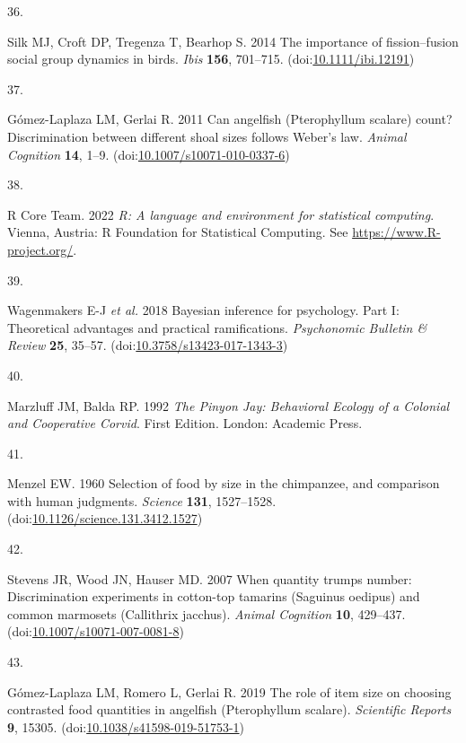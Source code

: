\documentclass[
  ,doc,floatsintext]{apa6}
\newlength{\cslhangindent}
\newlength{\csllabelwidth}
\newlength{\cslentryspacingunit} %
\newenvironment{CSLReferences}[2] %
 {%
  \setlength{\parindent}{0pt}
  \ifodd #1
  \let\oldpar\par
  \def\par{\hangindent=\cslhangindent\oldpar}
  \fi
  \setlength{\parskip}{#2\cslentryspacingunit}
 }%
 {}
\newcommand{\CSLLeftMargin}[1]{\parbox[t]{\csllabelwidth}{#1}}
\newcommand{\CSLRightInline}[1]{\parbox[t]{\linewidth - \csllabelwidth}{#1}\break}
\begin{document}
\begin{CSLReferences}{0}{0}
\leavevmode{}%
\CSLLeftMargin{36. }%
\CSLRightInline{Silk MJ, Croft DP, Tregenza T, Bearhop S. 2014 The importance of fission--fusion social group dynamics in birds. \emph{Ibis} \textbf{156}, 701--715. (doi:\href{https://doi.org/10.1111/ibi.12191}{10.1111/ibi.12191})}

\leavevmode{}%
\CSLLeftMargin{37. }%
\CSLRightInline{Gómez-Laplaza LM, Gerlai R. 2011 Can angelfish ({Pterophyllum} scalare) count? {Discrimination} between different shoal sizes follows {Weber}'s law. \emph{Animal Cognition} \textbf{14}, 1--9. (doi:\href{https://doi.org/10.1007/s10071-010-0337-6}{10.1007/s10071-010-0337-6})}

\leavevmode{}%
\CSLLeftMargin{38. }%
\CSLRightInline{R Core Team. 2022 \emph{R: A language and environment for statistical computing}. Vienna, Austria: R Foundation for Statistical Computing. See \url{https://www.R-project.org/}.}

\leavevmode{}%
\CSLLeftMargin{39. }%
\CSLRightInline{Wagenmakers E-J \emph{et al.} 2018 Bayesian inference for psychology. {Part} {I}: {Theoretical} advantages and practical ramifications. \emph{Psychonomic Bulletin \& Review} \textbf{25}, 35--57. (doi:\href{https://doi.org/10.3758/s13423-017-1343-3}{10.3758/s13423-017-1343-3})}

\leavevmode{}%
\CSLLeftMargin{40. }%
\CSLRightInline{Marzluff JM, Balda RP. 1992 \emph{The {Pinyon} {Jay}: {Behavioral} {Ecology} of a {Colonial} and {Cooperative} {Corvid}}. First Edition. London: Academic Press. }

\leavevmode{}%
\CSLLeftMargin{41. }%
\CSLRightInline{Menzel EW. 1960 Selection of food by size in the chimpanzee, and comparison with human judgments. \emph{Science} \textbf{131}, 1527--1528. (doi:\href{https://doi.org/10.1126/science.131.3412.1527}{10.1126/science.131.3412.1527})}

\leavevmode{}%
\CSLLeftMargin{42. }%
\CSLRightInline{Stevens JR, Wood JN, Hauser MD. 2007 When quantity trumps number: Discrimination experiments in cotton-top tamarins ({Saguinus} oedipus) and common marmosets ({Callithrix} jacchus). \emph{Animal Cognition} \textbf{10}, 429--437. (doi:\href{https://doi.org/10.1007/s10071-007-0081-8}{10.1007/s10071-007-0081-8})}

\leavevmode{}%
\CSLLeftMargin{43. }%
\CSLRightInline{Gómez-Laplaza LM, Romero L, Gerlai R. 2019 The role of item size on choosing contrasted food quantities in angelfish ({Pterophyllum} scalare). \emph{Scientific Reports} \textbf{9}, 15305. (doi:\href{https://doi.org/10.1038/s41598-019-51753-1}{10.1038/s41598-019-51753-1})}

\end{CSLReferences}
\end{document}
